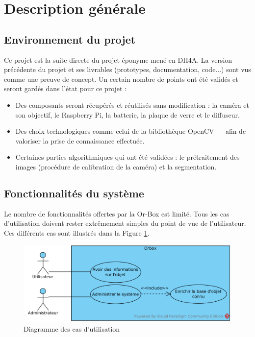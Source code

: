 
\section{Description générale}

	\subsection{Environnement du projet}
	\label{sec:envprojet}
	    
Ce projet est la suite directe du projet éponyme mené en DII4A.
La version précédente du projet et ses livrables (prototypes, documentation, code...) sont vus comme une preuve de concept.
Un certain nombre de points ont été validés et seront gardés dans l'état pour ce projet :
\begin{itemize}
	\item Des composants seront récupérés et réutilisés sans modification : la caméra et son objectif, le Raspberry Pi, la batterie, la plaque de verre et le diffuseur.
	\item Des choix technologiques comme celui de la bibliothèque OpenCV --- afin de valoriser la prise de connaissance effectuée.
	\item Certaines parties algorithmiques qui ont été validées : le prétraitement des images (procédure de calibration de la caméra) et la segmentation.
\end{itemize}
				

	\subsection{Fonctionnalités du système}
\label{sec:foncgales}
	
Le nombre de fonctionnalités offertes par la Or-Box est limité.
Tous les cas d'utilisation doivent rester extrêmement simples du point de vue de l'utilisateur.
Ces différents cas sont illustrés dans la Figure \ref{TopUCD}.

\begin{figure}[!ht]
    \centerline{
	    \includegraphics[scale=0.75]{img/SysML_Top_UCD.png}
    }
    \caption{Diagramme des cas d'utilisation}
    \label{TopUCD}
\end{figure}
    
